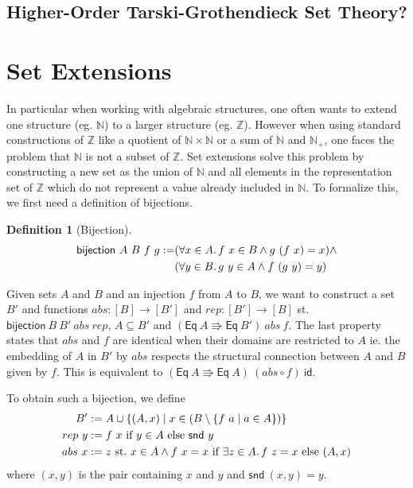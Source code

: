 \documentclass[]{article}
\theoremstyle{definition}
\newtheorem{definition}{Definition}[section]
\newcommand{\eq}{\mathsf{Eq}}
\newcommand{\id}{\mathsf{id}}
\newcommand{\bijection}{\mathsf{bijection}}
\newcommand{\snd}{\mathsf{snd}}
\newcommand{\nat}{\mathbb{N}}
\newcommand{\inte}{\mathbb{Z}}
\begin{document}
\subsection{Higher-Order Tarski-Grothendieck Set Theory?}

\section{Set Extensions}
In particular when working with algebraic structures, one often wants to extend one structure (eg. \(\nat\)) to a larger structure (eg. \(\inte\)). However when using standard constructions of \(\inte\) like a quotient of \(\nat \times \nat\) or a sum of \(\nat\) and \(\nat_+\), one faces the problem that \(\nat\) is not a subset of \(\inte\). Set extensions solve this problem by constructing a new set as the union of \(\nat\) and all elements in the representation set of \(\inte\) which do not represent a value already included in \(\nat\). To formalize this, we first need a definition of bijections.

\begin{definition}[Bijection]
	\begin{equation}
		\begin{split}
			\bijection\ A\ B\ f\ g := & (\forall x \in A\ldotp f\ x \in B \land g\ (f\ x) = x) \land \\
			& (\forall y \in B\ldotp g\ y \in A \land f\ (g\ y) = y)
		\end{split}
	\end{equation}
\end{definition}

Given sets \(A\) and \(B\) and an injection \(f\) from \(A\) to \(B\), we want to construct a set \(B'\) and functions \(abs : [B] \rightarrow [B']\) and \(rep : [B'] \rightarrow [B]\) st. \(\bijection\ B\ B'\ abs\ rep\), \(A \subseteq B'\) and \((\eq\ A \Rrightarrow \eq\ B')\ abs\ f\). The last property states that \(abs\) and \(f\) are identical when their domains are restricted to \(A\) ie. the embedding of \(A\) in \(B'\) by \(abs\) respects the structural connection between \(A\) and \(B\) given by \(f\). This is equivalent to \((\eq\ A \Rrightarrow \eq\ A)\ (abs \circ f)\ \id\).

To obtain such a bijection, we define
\begin{align}
	B' &:= A \cup \{(A, x) \mid x \in (B \setminus \{f\ a \mid a \in A\})\} \\
	rep\ y &:= f\ x\ \text{if}\ y \in A\ \text{else}\ \snd\ y \\
	abs\ x &:= z\ \text{st.}\ x \in A \land f\ x = x\ \text{if}\ \exists z \in A\ldotp f\ z = x\ \text{else}\ (A, x)
\end{align}
where \( (x, y) \) is the pair containing \(x\) and \(y\) and \(\snd\ (x, y) = y\).
\end{document}
